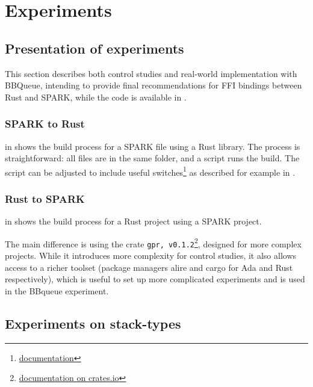 \documentclass[nomenclature, english, bibtex]{kththesis}
\begin{document}
\cleardoublepage
\chapter{Experiments}
\label{ch:whatYouDid}

\section{Presentation of experiments}


This section describes both control studies and real-world implementation with BBQueue, intending to provide final recommendations for FFI bindings between Rust and SPARK, while the code is available in . 





\subsection{SPARK to Rust}

 in 
shows the build process for a SPARK file using a Rust library. The process is straightforward: all files are in the same folder, and a script runs the build. The script can be adjusted to include useful switches\footnote{\href{https://docs.adacore.com/gnat_ugn-docs/html/gnat_ugn/gnat_ugn/building_executable_programs_with_gnat.html}{documentation}} as described for example in . 

\subsection{Rust to SPARK}

 in  shows the build process for a Rust project using a SPARK project. 

The main difference is using the crate \texttt{gpr, v0.1.2}\footnote{\href{https://crates.io/crates/gpr}{documentation on crates.io}}, designed for more complex projects\cite{kliemann_adding_2022}. While it introduces more complexity for control studies, it also allows access to a richer toolset (package managers alire and cargo for Ada and Rust respectively), which is useful to set up more complicated experiments and is used in the BBqueue experiment.  

\section{Experiments on stack-types}
\end{document}
